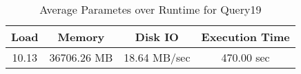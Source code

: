 \documentclass[../../main.tex]{subfiles}
\begin{document}
    \begin{table}
        \begin{center}
            \begin{tabular}{ |c|c|c|c| } 
            \hline
            Load & Memory & Disk IO & Execution Time\\
            \hline
            10.13 & 36706.26 MB & 18.64 MB/sec & 470.00 sec \\
            \hline
            \end{tabular}
            \\[1pt]
            \caption{Average Parametes over Runtime for Query19}
        \end{center}
    \end{table}
    \pagebreak
\end{document}
